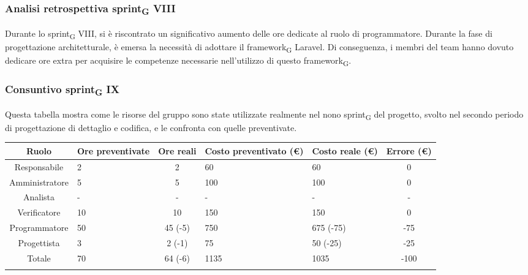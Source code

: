 \subsubsection{Analisi retrospettiva sprint\textsubscript{G} VIII}

Durante lo sprint\textsubscript{G} VIII, si è riscontrato un significativo aumento delle ore dedicate al ruolo di programmatore. 
Durante la fase di progettazione architetturale, è emersa la necessità di adottare il framework\textsubscript{G} Laravel. Di conseguenza, 
i membri del team hanno dovuto dedicare ore extra per acquisire le competenze necessarie nell'utilizzo di questo framework\textsubscript{G}. 

\newpage
\subsubsection{Consuntivo sprint\textsubscript{G} IX}

Questa tabella mostra come le risorse del gruppo sono state utilizzate realmente nel nono sprint\textsubscript{G} del progetto, svolto nel secondo periodo di progettazione di dettaglio e codifica, e le confronta con quelle preventivate.

\setlength\extrarowheight{5pt}
\begin{tabularx}{\textwidth}{|c|XcXX|c|}
	\hline
	\rowcolor{white}
	\textbf{Ruolo} & \textbf{Ore preventivate} & \textbf{Ore reali} & \textbf{Costo preventivato (€)} & \textbf{Costo reale (€)} & \textbf{Errore (€)} \\
	\hline
	Responsabile & 2 & 2 & 60 & 60 & 0 \\
	Amministratore & 5 & 5 & 100 & 100 & 0 \\
	Analista & - & - & - & - & - \\
	Verificatore & 10 & 10 & 150 & 150 & 0 \\
	Programmatore & 50 & 45 (-5) & 750 & 675 (-75) & -75 \\
	Progettista & 3 & 2 (-1) & 75 & 50 (-25) & -25 \\
	\hline
	Totale & 70 & 64 (-6) & 1135 & 1035 & -100 \\
	\hline
	\rowcolor{white}
	\caption{Consuntivo ore e costi per ruolo del nono sprint\textsubscript{G}}
\end{tabularx}

